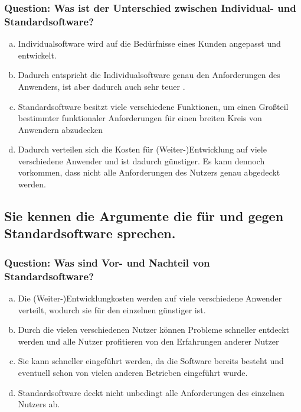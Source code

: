 \documentclass{article}
\begin{document}
\begin{adjustwidth}{2em}{2em}
\begin{adjustwidth}{2em}{2em}
\begin{adjustwidth}{1em}{}
				\subsubsection*{Question: Was ist der Unterschied zwischen Individual- und Standardsoftware?}
				\begin{adjustwidth}{1em}{}
					\begin{enumerate}[(a)]
						\item Individualsoftware wird auf die Bedürfnisse eines Kunden angepasst und entwickelt.
						\item Dadurch entspricht die Individualsoftware genau den Anforderungen des Anwenders, ist aber dadurch auch sehr teuer .
						\item Standardsoftware besitzt viele verschiedene Funktionen, um einen Großteil bestimmter funktionaler Anforderungen für einen breiten Kreis von Anwendern abzudecken
						\item Dadurch verteilen sich die Kosten für (Weiter-)Entwicklung auf viele verschiedene Anwender und ist dadurch günstiger. Es kann dennoch vorkommen, dass nicht alle Anforderungen des Nutzers genau abgedeckt werden.
					\end{enumerate}
				\end{adjustwidth}
			\end{adjustwidth}
			\subsection{Sie kennen die Argumente die für und gegen Standardsoftware sprechen.}
			\begin{adjustwidth}{1em}{}
				\subsubsection*{Question: Was sind Vor- und Nachteil von Standardsoftware?}
				\begin{adjustwidth}{1em}{}
					\begin{enumerate}[(a)]
						\item Die (Weiter-)Entwicklungkosten werden auf viele verschiedene Anwender verteilt, wodurch sie für den einzelnen günstiger ist.
						\item Durch die vielen verschiedenen Nutzer können Probleme schneller entdeckt werden und alle Nutzer profitieren von den Erfahrungen anderer Nutzer
						\item Sie kann schneller eingeführt werden, da die Software bereits besteht und eventuell schon von vielen anderen Betrieben eingeführt wurde.
						\item Standardsoftware deckt nicht unbedingt alle Anforderungen des einzelnen Nutzers ab.
					\end{enumerate}
				\end{adjustwidth}
			\end{adjustwidth}

\end{adjustwidth}
\end{adjustwidth}
\end{document}
